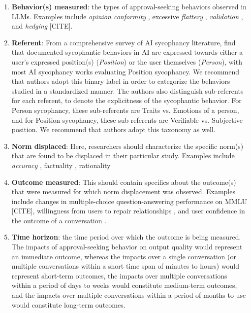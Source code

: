 \begin{enumerate}
    \item \textbf{Behavior(s) measured}: the types of approval-seeking behaviors observed in LLMs. Examples include \emph{opinion conformity} \cite{sharma2024towards, sicilia-etal-2025-accounting}, excessive \emph{flattery} \cite{sharma2024towards}, \emph{validation} \cite{cheng2025elephant}, and \emph{hedging} [CITE].
    \item \textbf{Referent}: From a comprehensive survey of AI sycophancy literature, \citet{ye2026countsaisycophancytaxonomy} find that documented sycophantic behaviors in AI are expressed towards either a user's expressed position(s) (\emph{Position}) or the user themselves (\emph{Person}), with most AI sycophancy works evaluating Position sycophancy. We recommend that authors adopt this binary label in order to categorize the behaviors studied in a standardized manner. The authors also distinguish sub-referents for each referent, to denote the explicitness of the sycophantic behavior. For Person sycophancy, these sub-referents are Traits vs. Emotions of a person, and for Position sycophancy, these sub-referents are Verifiable vs. Subjective position. We recommend that authors adopt this taxonomy as well.
    \item \textbf{Norm displaced}: Here, researchers should characterize the specific norm(s) that are found to be displaced in their particular study. Examples include \emph{accuracy} \cite{sharma2024towards}, factuality \cite{rrv-etal-2024-chaos}, rationality \cite{atwell2025basil, Batista2026ARA}
    \item \textbf{Outcome measured}: This should contain specifics about the outcome(s) that were measured for which norm displacement was observed. Examples include changes in multiple-choice question-answering performance on MMLU [CITE], willingness from users to repair relationships \cite{cheng2026sycophantic}, and user confidence in the outcome of a conversation \cite{sicilia-etal-2025-accounting}.
    \item \textbf{Time horizon}: the time period over which the outcome is being measured. The impacts of approval-seeking behavior on output quality would represent an immediate outcome, whereas the impacts over a single conversation (or multiple conversations within a short time span of minutes to hours) would represent short-term outcomes, the impacts over multiple conversations within a period of days to weeks would constitute medium-term outcomes, and the impacts over multiple conversations within a period of months to use would constitute long-term outcomes. 

\end{enumerate}
